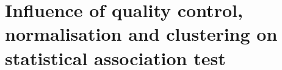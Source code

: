 %
%
%
%


\section{ Influence of quality control, normalisation and clustering on statistical association test }

